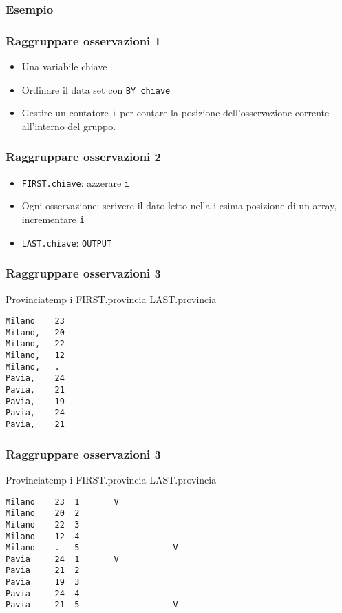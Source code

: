 \begin{frame}[containsverbatim]\frametitle{Esempio}
\end{frame}



\begin{frame}\frametitle{Raggruppare osservazioni 1}
  \begin{itemize}
  \item
    Una variabile \alert{chiave}
  \item
    Ordinare il data set con \texttt{BY chiave}
  \item
    Gestire un contatore \texttt{i} per contare la posizione dell'osservazione
    corrente all'interno del gruppo.
  \end{itemize}\end{frame}


\begin{frame}\frametitle{Raggruppare osservazioni 2}
  \begin{itemize}
  \item
    \texttt{FIRST.chiave}: azzerare  \texttt{i}
  \item
    Ogni osservazione: scrivere il dato letto nella i-esima posizione di un array,
    incrementare  \texttt{i}
  \item
    \texttt{LAST.chiave}: \texttt{OUTPUT}
  \end{itemize}\end{frame}


\begin{frame}[containsverbatim]\frametitle{Raggruppare osservazioni 3}
  \small
  Provincia\hspace{2ex}temp\hspace{1ex} i\hspace{1ex} FIRST.provincia\hspace{1ex} LAST.provincia
\begin{verbatim}
Milano    23
Milano,   20
Milano,   22
Milano,   12
Milano,   .
Pavia,    24
Pavia,    21
Pavia,    19
Pavia,    24
Pavia,    21
\end{verbatim}
\end{frame}

\begin{frame}[containsverbatim]\frametitle{Raggruppare osservazioni 3}
  \small
  Provincia\hspace{2ex}temp\hspace{1ex} i\hspace{1ex} FIRST.provincia\hspace{1ex} LAST.provincia
\begin{verbatim}
Milano    23  1       V
Milano    20  2
Milano    22  3
Milano    12  4
Milano    .   5                   V
Pavia     24  1       V
Pavia     21  2
Pavia     19  3
Pavia     24  4
Pavia     21  5                   V
\end{verbatim}
\end{frame}


